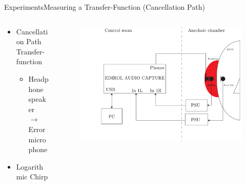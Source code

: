 \begin{frame}{Experiments}{Measuring a Transfer-Function (Cancellation Path)}		
	\begin{columns}
		\begin{column}{0.5\textwidth}
			\begin{itemize}
				\item Cancellation Path Transfer-function
				\begin{itemize}
					\item Headphone speaker \\ $\rightarrow$ Error microphone
				\end{itemize}
				\item{Logarithmic Chirp}
			\end{itemize}
		\end{column}
		\begin{column}{0.5\textwidth} 
			\begin{figure}[h]
				\includegraphics[width=1\textwidth]{figures/CancellationPath.pdf}
			\end{figure}
		\end{column}
	\end{columns}
\end{frame}

